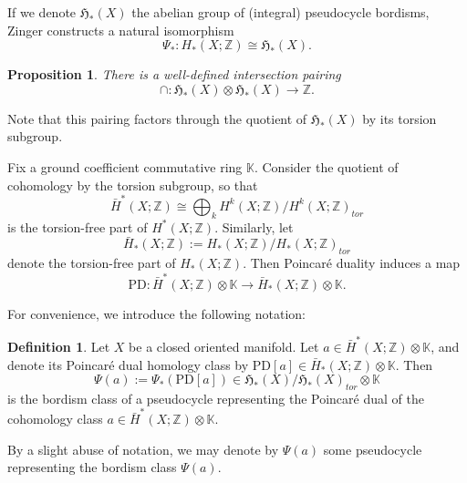 \documentclass[reqno]{amsart}
\numberwithin{equation}{section}
\numberwithin{equation}{section}
\numberwithin{equation}{section}
\newtheorem{prop}[thm]{Proposition}
\theoremstyle{definition}
\newtheorem{defn}[thm]{Definition}
\theoremstyle{remark}
\theoremstyle{remark}
\begin{document}
If we denote $\mathfrak{H}_*(X)$ the abelian group of (integral) pseudocycle bordisms, Zinger \cite{Zin08} constructs a natural isomorphism
\begin{equation}
    \Psi_* : H_*(X;\mathbb{Z}) \cong \mathfrak{H}_*(X).
\end{equation}
 
\begin{prop}
    There is a well-defined intersection pairing
    \begin{equation}
        \cap : \mathfrak{H}_*(X) \otimes \mathfrak{H}_*(X) \to \mathbb{Z}.
    \end{equation}
\end{prop}

Note that this pairing factors through the quotient of $\mathfrak{H}_*(X)$ by its torsion subgroup.

Fix a ground coefficient commutative ring $\mathbb{K}$. Consider the quotient of cohomology by the torsion subgroup, so that  
\begin{equation}    
\bar{H}^*(X;\mathbb{Z}) \cong \bigoplus_k H^k(X;\mathbb{Z})/H^k(X;\mathbb{Z})_{tor}
\end{equation}
is the torsion-free part of $H^*(X;\mathbb{Z})$. Similarly, let
$$\bar{H}_*(X;\mathbb{Z}):=H_*(X;\mathbb{Z})/H_*(X;\mathbb{Z})_{tor}$$ 
denote the torsion-free part of $H_*(X;\mathbb{Z})$. Then Poincar\'e duality induces a map
\begin{equation}
    \mathrm{PD}: \bar{H}^*(X;\mathbb{Z}) \otimes \mathbb{K} \to \bar{H}_*(X;\mathbb{Z}) \otimes \mathbb{K}.
\end{equation}

For convenience, we introduce the following notation:

\begin{defn}
    Let $X$ be a closed oriented manifold. Let $a \in \bar{H}^*(X;\mathbb{Z})\otimes \mathbb{K}$, and denote its Poincar\'e dual homology class by $\mathrm{PD}[a] \in \bar{H}_*(X;\mathbb{Z}) \otimes \mathbb{K}$. Then
    \begin{equation}
        \Psi(a) := \Psi_*(\mathrm{PD}[a]) \in \mathfrak{H}_*(X)/\mathfrak{H}_*(X)_{tor} \otimes \mathbb{K}
    \end{equation}
    is the bordism class of a pseudocycle representing the Poincar\'e dual of the cohomology class $a \in \bar{H}^*(X;\mathbb{Z})\otimes \mathbb{K}$.
\end{defn}
By a slight abuse of notation, we may denote by $\Psi(a)$ some pseudocycle representing the bordism class $\Psi(a)$. 
\end{document}
